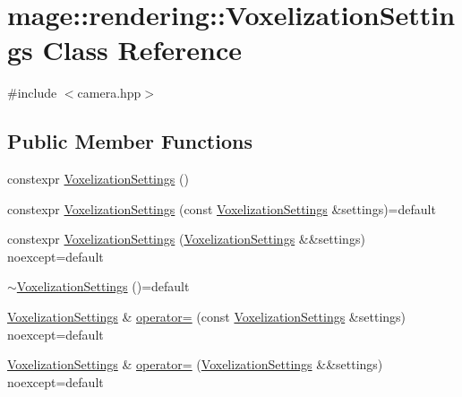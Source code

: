 \hypertarget{classmage_1_1rendering_1_1_voxelization_settings}{}\section{mage\+:\+:rendering\+:\+:Voxelization\+Settings Class Reference}
\label{classmage_1_1rendering_1_1_voxelization_settings}


{\ttfamily \#include $<$camera.\+hpp$>$}

\subsection*{Public Member Functions}
\begin{DoxyCompactItemize}
\item 
constexpr \mbox{\hyperlink{classmage_1_1rendering_1_1_voxelization_settings_a5c866be104571097091b07f113b2f680}{Voxelization\+Settings}} ()
\item 
constexpr \mbox{\hyperlink{classmage_1_1rendering_1_1_voxelization_settings_a62f8755e86da892cd22467309fecfe95}{Voxelization\+Settings}} (const \mbox{\hyperlink{classmage_1_1rendering_1_1_voxelization_settings}{Voxelization\+Settings}} \&settings)=default
\item 
constexpr \mbox{\hyperlink{classmage_1_1rendering_1_1_voxelization_settings_af706582ce61228cd994aa72c537aa020}{Voxelization\+Settings}} (\mbox{\hyperlink{classmage_1_1rendering_1_1_voxelization_settings}{Voxelization\+Settings}} \&\&settings) noexcept=default
\item 
\mbox{\hyperlink{classmage_1_1rendering_1_1_voxelization_settings_aa9593796b2dd3b9d3a8f6b00ba225778}{$\sim$\+Voxelization\+Settings}} ()=default
\item 
\mbox{\hyperlink{classmage_1_1rendering_1_1_voxelization_settings}{Voxelization\+Settings}} \& \mbox{\hyperlink{classmage_1_1rendering_1_1_voxelization_settings_a17041a231eb594add5b602d217b39fa3}{operator=}} (const \mbox{\hyperlink{classmage_1_1rendering_1_1_voxelization_settings}{Voxelization\+Settings}} \&settings) noexcept=default
\item 
\mbox{\hyperlink{classmage_1_1rendering_1_1_voxelization_settings}{Voxelization\+Settings}} \& \mbox{\hyperlink{classmage_1_1rendering_1_1_voxelization_settings_a95cb849852ead8fcde426ce85601061e}{operator=}} (\mbox{\hyperlink{classmage_1_1rendering_1_1_voxelization_settings}{Voxelization\+Settings}} \&\&settings) noexcept=default
\item 

\end{DoxyCompactItemize}
